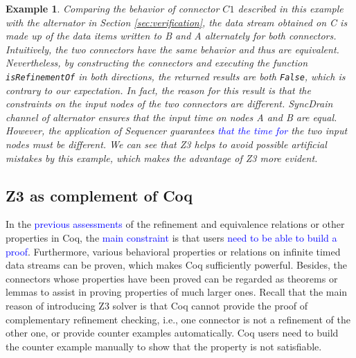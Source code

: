 \documentclass[preprint,3p]{elsarticle}
\newcommand{\liyi}[1]{\textcolor{blue}{#1}}
\newcommand{\xy}[1]{{#1}}
\newtheorem{example}{Example}[section]
\begin{document}
\begin{example}
Comparing the behavior of connector $C1$ described in this example with the \emph{alternator} in Section \ref{sec:verification}, the data stream obtained on \emph{C} is made up of the data items written to \emph{B} and \emph{A} alternately for both connectors. Intuitively, the two connectors have the same behavior and thus are equivalent. Nevertheless, by constructing the connectors and executing the function \texttt{isRefinementOf} in both directions, the returned results are both \texttt{False}, which is contrary to our expectation. In fact, the reason for this result is that the constraints on the input nodes of the two connectors are different. \emph{SyncDrain} channel of \emph{alternator} ensures that the input time on nodes \emph{A} and \emph{B} are equal. However, the application of \emph{Sequencer} guarantees \liyi{that the time for} the two input nodes must be different. We can see that Z3 helps to avoid possible artificial mistakes by this example, which makes the advantage of Z3 more evident.


\end{example}

\subsection{Z3 as complement of Coq}
In the \liyi{previous assessments} of the refinement and equivalence relations or other properties in Coq, the \liyi{main constraint} is that users \liyi{need to be able to build a proof}. Furthermore, various behavioral properties or relations on infinite timed data streams can be proven, which makes Coq sufficiently powerful. Besides, the connectors whose properties have been proved can be regarded as theorems or lemmas to assist in proving properties of much larger ones. Recall that the main reason of introducing Z3 solver is that \xy{Coq cannot provide the proof of complementary refinement checking, i.e., one connector is not a refinement of the other one, or provide counter examples automatically. Coq users need to build the counter example manually to show that the property is not satisfiable.}
\end{document}

